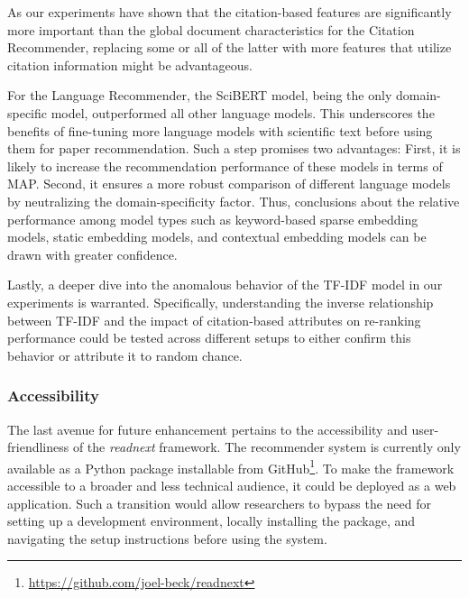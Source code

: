 As our experiments have shown that the citation-based features are significantly more important than the global document characteristics for the Citation Recommender, replacing some or all of the latter with more features that utilize citation information might be advantageous.

For the Language Recommender, the SciBERT model, being the only domain-specific model, outperformed all other language models. This underscores the benefits of fine-tuning more language models with scientific text before using them for paper recommendation.
Such a step promises two advantages: First, it is likely to increase the recommendation performance of these models in terms of \ac{MAP}.
Second, it ensures a more robust comparison of different language models by neutralizing the domain-specificity factor.
Thus, conclusions about the relative performance among model types such as keyword-based sparse embedding models, static embedding models, and contextual embedding models can be drawn with greater confidence.

Lastly, a deeper dive into the anomalous behavior of the TF-IDF model in our experiments is warranted. Specifically, understanding the inverse relationship between TF-IDF and the impact of citation-based attributes on re-ranking performance could be tested across different setups to either confirm this behavior or attribute it to random chance.


\subsubsection*{Accessibility}

The last avenue for future enhancement pertains to the accessibility and user-friendliness of the \emph{readnext} framework.
The recommender system is currently only available as a Python package installable from GitHub\footnote{\url{https://github.com/joel-beck/readnext}}.
To make the framework accessible to a broader and less technical audience, it could be deployed as a web application.
Such a transition would allow researchers to bypass the need for setting up a development environment, locally installing the package, and navigating the setup instructions before using the system.
